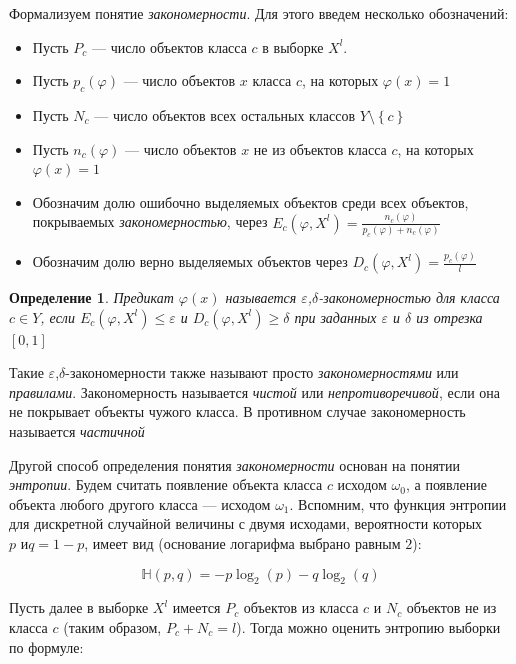 \documentclass[12pt]{article}
\newtheorem{definition}{Определение}
\begin{document}
Формализуем понятие \emph{закономерности}. Для этого введем несколько
обозначений:

\begin{itemize}
\item Пусть \(P_c\) --- число объектов класса \(c\) в выборке \(X^l\).
\item Пусть \(p_c(\varphi)\) --- число объектов \(x\) класса \(c\), на
  которых \(\varphi(x) = 1\)
\item Пусть \(N_c\) --- число объектов всех остальных классов \(Y
  \setminus \left\{c\right\}\)
\item Пусть \(n_c(\varphi)\) --- число объектов \(x\) не из объектов
  класса \(c\), на которых \(\varphi(x) = 1\)
\item Обозначим долю ошибочно выделяемых объектов среди всех объектов,
  покрываемых \emph{закономерностью}, через \(E_c(\varphi, X^l) =
  \frac{n_c(\varphi)}{p_c(\varphi) + n_c(\varphi)}\)
\item Обозначим долю верно выделяемых объектов через \(D_c(\varphi,
  X^l) = \frac{p_c(\varphi)}{l}\)
\end{itemize}

\begin{definition}
  Предикат \(\varphi(x)\) называется
  \emph{\(\varepsilon\),\(\delta\)-закономерностью} для класса \(c \in
  Y\), если \(E_c(\varphi, X^l) \leqslant \varepsilon \) и \(D_c(\varphi,
  X^l)\geqslant\delta\) при заданных \(\varepsilon\) и \(\delta\) из
  отрезка \([0, 1]\)
\end{definition}

Такие \(\varepsilon\),\(\delta\)-закономерности также называют просто
\emph{закономерностями} или \emph{правилами}. Закономерность
называется \emph{чистой} или \emph{непротиворечивой}, если она не
покрывает объекты чужого класса. В противном случае закономерность
называется \emph{частичной}

Другой способ определения понятия \emph{закономерности} основан на
понятии \emph{энтропии}. Будем считать появление объекта класса \(c\)
исходом \(\omega_0\), а появление объекта любого другого класса ---
исходом \(\omega_1\). Вспомним, что функция энтропии для дискретной
случайной величины с двумя исходами, вероятности которых \(p \text{ и
} q = 1 - p\), имеет вид (основание логарифма выбрано равным \(2\)):

\[\mathbb{H}(p, q) = -p\log_2(p)-q\log_2(q)\]

Пусть далее в выборке \(X^l\) имеется \(P_c\) объектов из класса \(c\)
и \(N_c\) объектов не из класса \(c\) (таким образом, \(P_c + N_c =
l\)). Тогда можно оценить энтропию выборки по формуле:
\end{document}

